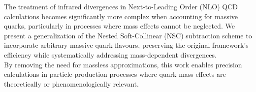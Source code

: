
The treatment of infrared divergences in Next-to-Leading Order (NLO) QCD calculations becomes significantly more complex when accounting for massive quarks, particularly in processes where mass effects cannot be neglected. We present a generalization of the Nested Soft-Collinear (NSC) subtraction scheme to incorporate arbitrary massive quark flavours, preserving the original framework’s efficiency while systematically addressing mass-dependent divergences. \\
By removing the need for massless approximations, this work enables precision calculations in particle-production processes where quark mass effects are theoretically or phenomenologically relevant.
